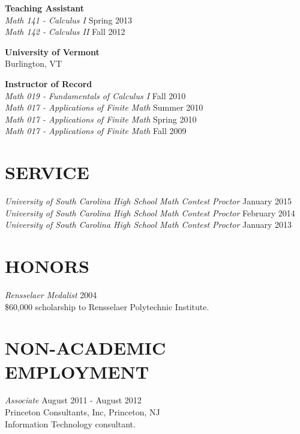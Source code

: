 \documentclass[line,overlapped]{res}
\begin{document}
\begin{resume}
         {\bf Teaching Assistant}\\
         {\sl Math 141 - Calculus I} \hfill Spring 2013\\
         {\sl Math 142 - Calculus II} \hfill Fall 2012

         {\bf University of Vermont}\\Burlington, VT
         
         {\bf Instructor of Record}\\
         {\sl Math 019 - Fundamentals of Calculus I} \hfill Fall 2010\\
         {\sl Math 017 - Applications of Finite Math} \hfill Summer 2010\\
         {\sl Math 017 - Applications of Finite Math} \hfill Spring 2010\\
         {\sl Math 017 - Applications of Finite Math} \hfill Fall 2009\\
         
 \section{SERVICE}
         {\sl University of South Carolina High School Math Contest Proctor} \hfill January 2015\\
         {\sl University of South Carolina High School Math Contest Proctor} \hfill February 2014\\
         {\sl University of South Carolina High School Math Contest Proctor} \hfill January 2013

 \section{HONORS}
         {\sl Rensselaer Medalist} \hfill 2004\\
         \$60,000 scholarship to Rensselaer Polytechnic Institute.

\newpage
         
 \section{NON-ACADEMIC\\EMPLOYMENT}             
         {\sl Associate} \hfill August 2011 - August 2012\\
         Princeton Consultants, Inc, Princeton, NJ\\
         Information Technology consultant.


\end{resume}
\end{document}

